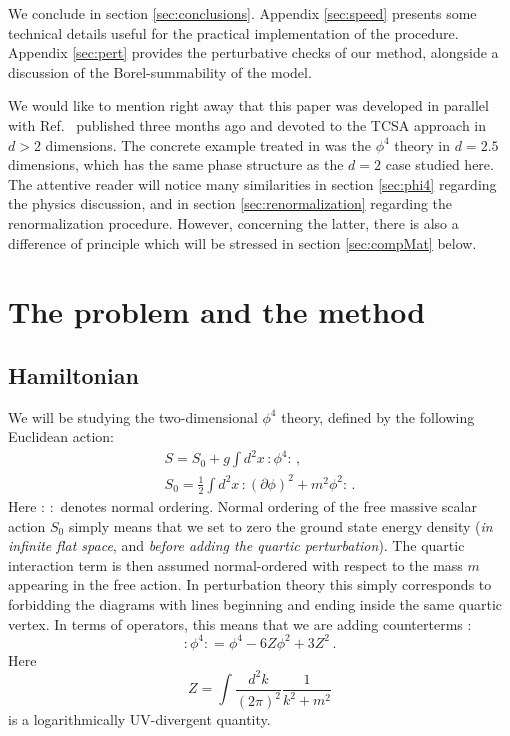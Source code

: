 \documentclass[11pt]{article}
\newcommand{\beq}{\begin{equation}}
\newcommand{\eeq}{\end{equation}}
\def\del {\partial}
\newcommand{\NO}[1]{{:\!#1\!:}}
\def\del{\partial}
\numberwithin{equation}{section}
\begin{document}
We conclude in section \ref{sec:conclusions}. Appendix \ref{sec:speed} presents some technical details useful for the practical implementation of the procedure. 
Appendix \ref{sec:pert} provides the perturbative checks of our method, alongside a discussion of the Borel-summability of the model.

We would like to mention right away that this paper was developed in parallel with Ref.~\cite{Hogervorst:2014rta} published three months ago and devoted to the TCSA approach in $d>2$ dimensions. The concrete example treated in \cite{Hogervorst:2014rta} was the $\phi^4$ theory in $d=2.5$ dimensions, which has the same phase structure as the $d=2$ case studied here. The attentive reader will notice many similarities in section \ref{sec:phi4} regarding the physics discussion, and in section \ref{sec:renormalization} regarding the renormalization procedure. However, concerning the latter, there is also a difference of principle which will be stressed in section \ref{sec:compMat} below.

\section{The problem and the method}
\label{sec:probl_meth}

\subsection{Hamiltonian}

\label{sec:probl_meth1}
We will be studying the two-dimensional $\phi^4$ theory, defined by the following Euclidean action:
\begin{gather}
S= S_0+g\int d^2 x\, \NO{\phi^4}\,, \label{eq:action}\\
S_0= \frac{1}{2} \int d^2 x\, \NO{(\del\phi)^2 + m^2 \phi^2}\,.
\end{gather}
Here $:\,:$ denotes normal ordering. Normal ordering of the free massive scalar action $S_0$ simply means that we set to zero the ground state energy density ({\it in infinite flat space}, and {\it before adding the quartic perturbation}).
The quartic interaction term is then assumed normal-ordered with respect to the mass $m$ appearing in the free action. In perturbation theory this simply corresponds to forbidding the diagrams with lines beginning and ending inside the same quartic vertex. In terms of operators, this means that we are adding counterterms \cite{Coleman:1974bu}:
\beq
\label{eq:NOphi4}
\NO{\phi^4}=\phi^4 - 6 Z \phi^2 + 3 Z^2\,. 
\eeq
Here
\beq
Z=\int \frac{d^2k}{(2\pi)^2}\frac{1}{k^2+m^2} 
\eeq
is a logarithmically UV-divergent quantity.
\end{document}
